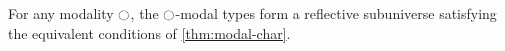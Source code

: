 \documentclass[hott-all.tex]{subfiles}
\begin{document}
% 
% 
\begin{cor}
  For any modality $\ocircle$, the $\ocircle$-modal types form a reflective subuniverse satisfying the equivalent conditions of \cref{thm:modal-char}.
\end{cor}
% 
% 
\end{document}
